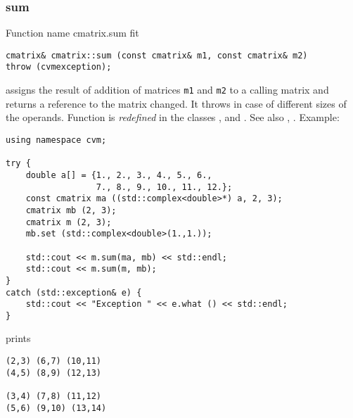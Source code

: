 \subsubsection{sum}
Function%
\pdfdest name {cmatrix.sum} fit
\begin{verbatim}
cmatrix& cmatrix::sum (const cmatrix& m1, const cmatrix& m2)
throw (cvmexception);
\end{verbatim}
assigns the result of addition of
matrices \verb"m1" and \verb"m2"  to a calling matrix
and returns a reference to
the matrix changed.
It throws  
in case of different sizes of the operands.
Function is \emph{redefined} in the classes
,  
and .
See also ,
.
Example:
\begin{Verbatim}
using namespace cvm;

try {
    double a[] = {1., 2., 3., 4., 5., 6.,
                  7., 8., 9., 10., 11., 12.};
    const cmatrix ma ((std::complex<double>*) a, 2, 3);
    cmatrix mb (2, 3);
    cmatrix m (2, 3);
    mb.set (std::complex<double>(1.,1.));

    std::cout << m.sum(ma, mb) << std::endl;
    std::cout << m.sum(m, mb);
}
catch (std::exception& e) {
    std::cout << "Exception " << e.what () << std::endl;
}
\end{Verbatim}
prints
\begin{Verbatim}
(2,3) (6,7) (10,11)
(4,5) (8,9) (12,13)

(3,4) (7,8) (11,12)
(5,6) (9,10) (13,14)
\end{Verbatim}
\newpage



